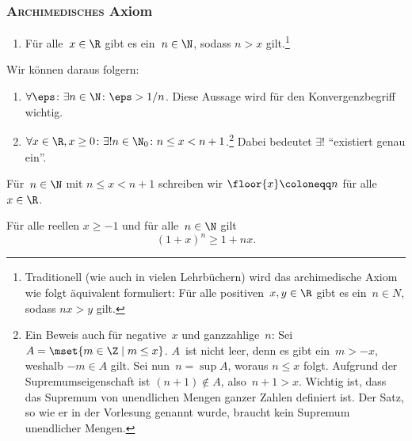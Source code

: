 \documentclass[a4paper]{article}
\begin{document}
\subsubsection{\textsc{Archimedisches} Axiom}

\begin{axiom}\leavevmode
    \begin{enumerate}[resume*=axioms]
        \item Für alle~$x \in \R$ gibt es ein~$n \in \N$, sodass $n > x$ gilt.\footnote{Traditionell (wie auch in vielen Lehrbüchern) wird das archimedische Axiom wie folgt äquivalent formuliert: Für alle positiven~$x, y \in \R$ gibt es ein~$n \in N$, sodass $nx > y$ gilt.}
    \end{enumerate}
\end{axiom}

Wir können daraus folgern:
\begin{enumerate}[resume*=conclusions]
    \item $\forall \eps\colon \exists n \in \N\colon \eps > 1/n$. Diese Aussage wird für den Konvergenzbegriff wichtig.\label{arch:inverse}
    \item $\forall x \in \R, x \geq 0\colon \exists! n \in \N_0\colon n \leq x < n+1$.\footnote{Ein Beweis auch für negative~$x$ und ganzzahlige~$n$: Sei $A = \mset{m \in \Z \mid m \leq x}$. $A$~ist nicht leer, denn es gibt ein~$m > -x$, weshalb $-m \in A$ gilt. Sei nun~$n = \sup A$, woraus $n \leq x$ folgt. Aufgrund der Supremumseigenschaft ist $(n+1) \notin A$, also~$n+1 > x$. Wichtig ist, dass das Supremum von unendlichen Mengen ganzer Zahlen definiert ist. Der Satz, so wie er in der Vorlesung genannt wurde, braucht kein Supremum unendlicher Mengen.} Dabei bedeutet $\exists!$ "`existiert genau ein"'.
\end{enumerate}

\begin{notation}
    Für~$n \in \N$ mit $n \leq x < n+1$ schreiben wir $\floor{x} \coloneqq n$ für alle~$x \in \R$.
\end{notation}

\begin{theorem}\label{thm:bernoulliineq}
    Für alle reellen $x \geq -1$ und für alle~$n \in \N$ gilt
    \begin{equation*}
        (1 + x)^n \geq 1 + nx.
    \end{equation*}
\end{theorem}
\end{document}
